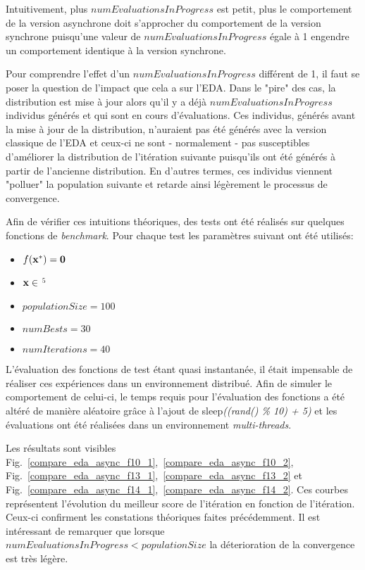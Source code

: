 \documentclass[a4paper, 11pt]{report}
\begin{document}
Intuitivement, plus $numEvaluationsInProgress$ est petit, plus le comportement de la version asynchrone doit s'approcher du comportement de la version synchrone puisqu'une valeur de $numEvaluationsInProgress$ égale à 1 engendre un comportement identique à la version synchrone.

Pour comprendre l'effet d'un $numEvaluationsInProgress$ différent de 1, il faut se poser la question de l'impact que cela a sur l'EDA. Dans le "pire" des cas, la distribution est mise à jour alors qu'il y a déjà $numEvaluationsInProgress$ individus générés et qui sont en cours d'évaluations. Ces individus, générés avant la mise à jour de la distribution, n'auraient pas été générés avec la version classique de l'EDA et ceux-ci ne sont - normalement - pas susceptibles d'améliorer la distribution de l'itération suivante puisqu'ils ont été générés à partir de l'ancienne distribution. En d'autres termes, ces individus viennent "polluer" la population suivante et retarde ainsi légèrement le processus de convergence.

Afin de vérifier ces intuitions théoriques, des tests ont été réalisés sur quelques fonctions de \textit{benchmark}. Pour chaque test les paramètres suivant ont été utilisés:
\begin{itemize}
\item $f(\bf{x}^*) = 0$
\item $\bf{x} \in $ $^{5}$
\item $populationSize = 100$
\item $numBests = 30$
\item $numIterations = 40$
\end{itemize}
L'évaluation des fonctions de test étant quasi instantanée, il était impensable de réaliser ces expériences dans un environnement distribué. Afin de simuler le comportement de celui-ci, le temps requis pour l'évaluation des fonctions a été altéré de manière aléatoire grâce à l'ajout de sleep\textit{((\textnormal{rand}() \% 10) + 5)} et les évaluations ont été réalisées dans un environnement \textit{multi-threads}. 

Les résultats sont visibles Fig.~\ref{compare_eda_async_f10_1},~\ref{compare_eda_async_f10_2}, Fig.~\ref{compare_eda_async_f13_1},~\ref{compare_eda_async_f13_2} et Fig.~\ref{compare_eda_async_f14_1},~\ref{compare_eda_async_f14_2}. Ces courbes représentent l'évolution du meilleur score de l'itération en fonction de l'itération. Ceux-ci confirment les constations théoriques faites précédemment. Il est intéressant de remarquer que lorsque $numEvaluationsInProgress < populationSize$ la déterioration de la convergence est très légère.
\end{document}
